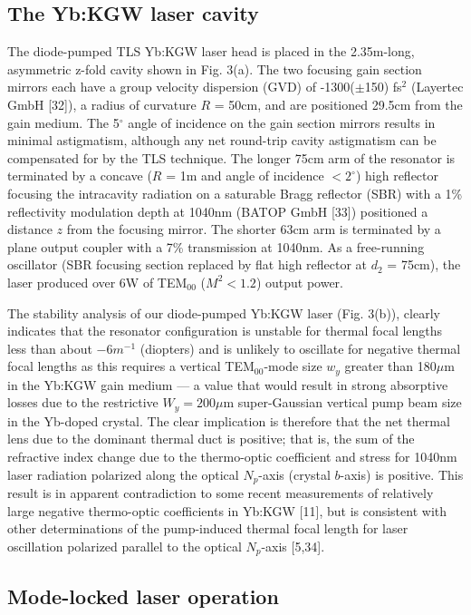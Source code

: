 \subsection{The Yb:KGW laser cavity}

The diode-pumped TLS Yb:KGW laser head is placed in the 2.35m-long, asymmetric z-fold cavity shown in Fig. 3(a).
The two focusing gain section mirrors each have a group velocity dispersion (GVD) of -1300($\pm$150) fs$^2$ (Layertec GmbH [32]), a radius of curvature $R$ = 50cm, and are positioned 29.5cm from the gain medium.
The 5$^\circ$ angle of incidence on the gain section mirrors results in minimal astigmatism, although any net round-trip cavity astigmatism can be compensated for by the TLS technique.
The longer 75cm arm of the resonator is terminated by a concave ($R$ = 1m and angle of incidence $< 2^\circ$) high reflector
focusing the intracavity radiation on a saturable Bragg reflector (SBR) with a 1\% reflectivity modulation depth at 1040nm (BATOP GmbH [33]) positioned a distance $z$ from the focusing mirror.
The shorter 63cm arm is terminated by a plane output coupler with a 7\% transmission at 1040nm.
As a free-running oscillator (SBR focusing section replaced by flat high reflector at $d_2$ = 75cm), the laser produced over 6W of TEM$_{00}$ ($M^2 < 1.2$) output power.

The stability analysis of our diode-pumped Yb:KGW laser (Fig. 3(b)), clearly indicates that the resonator configuration is unstable for thermal focal lengths less than about $-6m^{-1}$ (diopters) and is unlikely to oscillate for negative thermal focal lengths as this requires a vertical TEM$_{00}$-mode size $w_y$ greater than 180$\mu$m in the Yb:KGW gain medium --- a value that would result in strong absorptive losses due to the restrictive $W_y = 200\mu$m super-Gaussian vertical pump beam size in the Yb-doped crystal.
The clear implication is therefore that the net thermal lens due to the dominant thermal duct is positive; that is, the sum of the refractive index change due to the thermo-optic coefficient and stress for 1040nm laser radiation polarized along the optical $N_p$-axis (crystal $b$-axis) is positive.
This result is in apparent contradiction to some recent measurements of relatively large negative thermo-optic coefficients in Yb:KGW [11], but is consistent with other determinations of the pump-induced thermal focal length for laser oscillation polarized parallel to the optical $N_p$-axis [5,34].

\subsection{Mode-locked laser operation}

